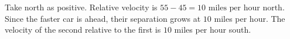 Take north as positive. Relative velocity is $55-45=\boxed{10\text{ miles per hour north}}$. Since the faster car is ahead, their separation grows at $10$ miles per hour. The velocity of the second relative to the first is $10$ miles per hour south.
